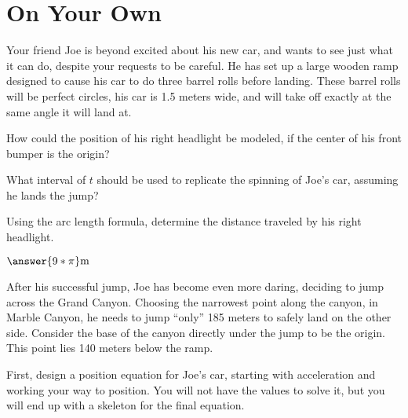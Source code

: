 \documentclass{ximera}
\begin{document}
\section{On Your Own}
\begin{question}
\item Your friend Joe is beyond excited about his new car, and wants to see just what it can do, despite your requests to be careful. He has set up a large wooden ramp designed to cause his car to do three barrel rolls before landing. These barrel rolls will be perfect circles, his car is 1.5 meters wide, and will take off exactly at the same angle it will land at.

How could the position of his right headlight be modeled, if the center of his front bumper is the origin?

\begin{multipleChoice}
\end{multipleChoice}

What interval of $t$ should be used to replicate the spinning of Joe's car, assuming he lands the jump?

\begin{multipleChoice}
\end{multipleChoice}

Using the arc length formula, determine the distance traveled by his right headlight.

\begin{onlineOnly}
\begin{sageCell}

\end{sageCell}
\end{onlineOnly}

$\answer{9*\pi}\text{m}$
\end{question}
After his successful jump, Joe has become even more daring, deciding to jump across the Grand Canyon. Choosing the narrowest point along the canyon, in Marble Canyon, he needs to jump ``only'' 185 meters to safely land on the other side. Consider the base of the canyon directly under the jump to be the origin. This point lies 140 meters below the ramp.

First, design a position equation for Joe's car, starting with acceleration and working your way to position. You will not have the values to solve it, but you will end up with a skeleton for the final equation.
\end{document}

